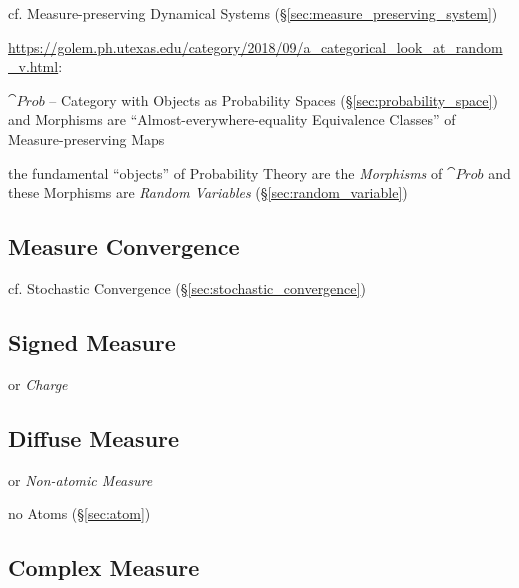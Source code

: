 cf. Measure-preserving Dynamical Systems (\S\ref{sec:measure_preserving_system})

\url{https://golem.ph.utexas.edu/category/2018/09/a_categorical_look_at_random_v.html}:

$\cat{Prob}$ -- Category with Objects as Probability Spaces
(\S\ref{sec:probability_space}) and Morphisms are ``Almost-everywhere-equality
Equivalence Classes'' of Measure-preserving Maps

the fundamental ``objects'' of Probability Theory are the \emph{Morphisms} of
$\cat{Prob}$ and these Morphisms are \emph{Random Variables}
(\S\ref{sec:random_variable})



\subsection{Measure Convergence}\label{sec:measure_convergence}

cf. Stochastic Convergence (\S\ref{sec:stochastic_convergence})



\subsection{Signed Measure}\label{sec:signed_measure}

or \emph{Charge}



\subsection{Diffuse Measure}\label{sec:diffuse_measure}

or \emph{Non-atomic Measure}

no Atoms (\S\ref{sec:atom})



\subsection{Complex Measure}\label{sec:complex_measure}

